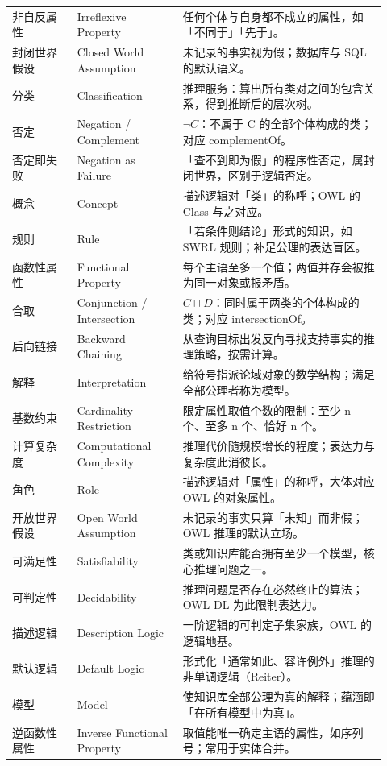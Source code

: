 \begin{longtable}{@{}p{0.16\linewidth}p{0.26\linewidth}p{0.5\linewidth}@{}}
非自反属性 & Irreflexive Property & 任何个体与自身都不成立的属性，如「不同于」「先于」。 \\
封闭世界假设 & Closed World Assumption & 未记录的事实视为假；数据库与 SQL 的默认语义。 \\
分类 & Classification & 推理服务：算出所有类对之间的包含关系，得到推断后的层次树。 \\
否定 & Negation / Complement & \(\lnot C\)：不属于 C 的全部个体构成的类；对应 complementOf。 \\
否定即失败 & Negation as Failure & 「查不到即为假」的程序性否定，属封闭世界，区别于逻辑否定。 \\
概念 & Concept & 描述逻辑对「类」的称呼；OWL 的 Class 与之对应。 \\
规则 & Rule & 「若条件则结论」形式的知识，如 SWRL 规则；补足公理的表达盲区。 \\
函数性属性 & Functional Property & 每个主语至多一个值；两值并存会被推为同一对象或报矛盾。 \\
合取 & Conjunction / Intersection & \(C \sqcap D\)：同时属于两类的个体构成的类；对应 intersectionOf。 \\
后向链接 & Backward Chaining & 从查询目标出发反向寻找支持事实的推理策略，按需计算。 \\
解释 & Interpretation & 给符号指派论域对象的数学结构；满足全部公理者称为模型。 \\
基数约束 & Cardinality Restriction & 限定属性取值个数的限制：至少 n 个、至多 n 个、恰好 n 个。 \\
计算复杂度 & Computational Complexity & 推理代价随规模增长的程度；表达力与复杂度此消彼长。 \\
角色 & Role & 描述逻辑对「属性」的称呼，大体对应 OWL 的对象属性。 \\
开放世界假设 & Open World Assumption & 未记录的事实只算「未知」而非假；OWL 推理的默认立场。 \\
可满足性 & Satisfiability & 类或知识库能否拥有至少一个模型，核心推理问题之一。 \\
可判定性 & Decidability & 推理问题是否存在必然终止的算法；OWL DL 为此限制表达力。 \\
描述逻辑 & Description Logic & 一阶逻辑的可判定子集家族，OWL 的逻辑地基。 \\
默认逻辑 & Default Logic & 形式化「通常如此、容许例外」推理的非单调逻辑（Reiter）。 \\
模型 & Model & 使知识库全部公理为真的解释；蕴涵即「在所有模型中为真」。 \\
逆函数性属性 & Inverse Functional Property & 取值能唯一确定主语的属性，如序列号；常用于实体合并。 \\

\end{longtable}
